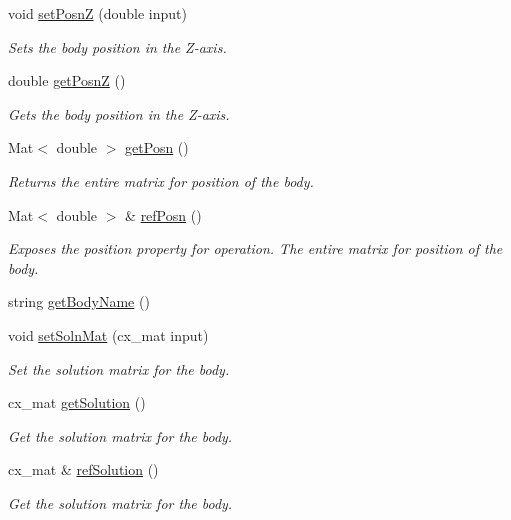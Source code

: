 \begin{DoxyCompactItemize}
void \hyperlink{class_body_a36a7e543c0bdad30bb16eda563543ac4}{set\-Posn\-Z} (double input)
\begin{DoxyCompactList}\small\item\em Sets the body position in the Z-\/axis. \end{DoxyCompactList}\item 
double \hyperlink{class_body_aaeddfd614683a8bc7fe81383667314a9}{get\-Posn\-Z} ()
\begin{DoxyCompactList}\small\item\em Gets the body position in the Z-\/axis. \end{DoxyCompactList}\item 
Mat$<$ double $>$ \hyperlink{class_body_a09987e449c77ba11fb66cf81de88220a}{get\-Posn} ()
\begin{DoxyCompactList}\small\item\em Returns the entire matrix for position of the body. \end{DoxyCompactList}\item 
Mat$<$ double $>$ \& \hyperlink{class_body_ad34f38992e14d5bda02c481c311b66b3}{ref\-Posn} ()
\begin{DoxyCompactList}\small\item\em Exposes the position property for operation. The entire matrix for position of the body. \end{DoxyCompactList}\item 
string \hyperlink{class_body_aab63febbe35984d8551a188b40ee3c3f}{get\-Body\-Name} ()
\item 
void \hyperlink{class_body_a202cf4dbcc9b1cbd268f02905ddebbb2}{set\-Soln\-Mat} (cx\-\_\-mat input)
\begin{DoxyCompactList}\small\item\em Set the solution matrix for the body. \end{DoxyCompactList}\item 
cx\-\_\-mat \hyperlink{class_body_a5153b4cfad5bf12ae6f279a5e7190c31}{get\-Solution} ()
\begin{DoxyCompactList}\small\item\em Get the solution matrix for the body. \end{DoxyCompactList}\item 
cx\-\_\-mat \& \hyperlink{class_body_ae799af5531c35381830061f6abc0bb17}{ref\-Solution} ()
\begin{DoxyCompactList}\small\item\em Get the solution matrix for the body. \end{DoxyCompactList}\item 

\end{DoxyCompactItemize}
